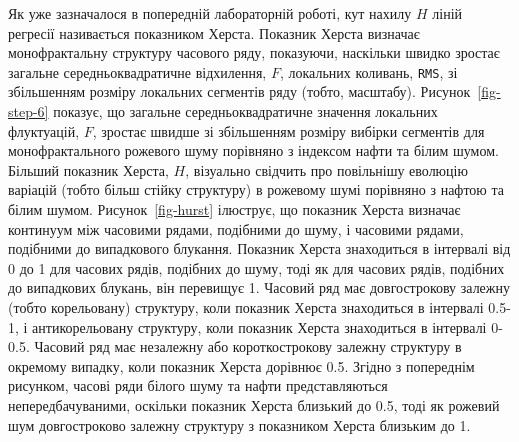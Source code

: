 \documentclass[
  letterpaper,
]{report}
\begin{document}
Як уже зазначалося в попередній лабораторній роботі, кут нахилу \(H\)
ліній регресії називається показником Херста. Показник Херста визначає
монофрактальну структуру часового ряду, показуючи, наскільки швидко
зростає загальне середньоквадратичне відхилення, \(F\), локальних
коливань, \texttt{RMS}, зі збільшенням розміру локальних сегментів ряду
(тобто, масштабу). Рисунок~\ref{fig-step-6} показує, що загальне
середньоквадратичне значення локальних флуктуацій, \(F\), зростає швидше
зі збільшенням розміру вибірки сегментів для монофрактального рожевого
шуму порівняно з індексом нафти та білим шумом. Більший показник Херста,
\(H\), візуально свідчить про повільнішу еволюцію варіацій (тобто більш
стійку структуру) в рожевому шумі порівняно з нафтою та білим шумом.
Рисунок~\ref{fig-hurst} ілюструє, що показник Херста визначає континуум
між часовими рядами, подібними до шуму, і часовими рядами, подібними до
випадкового блукання. Показник Херста знаходиться в інтервалі від 0 до 1
для часових рядів, подібних до шуму, тоді як для часових рядів, подібних
до випадкових блукань, він перевищує 1. Часовий ряд має довгострокову
залежну (тобто корельовану) структуру, коли показник Херста знаходиться
в інтервалі 0.5-1, і антикорельовану структуру, коли показник Херста
знаходиться в інтервалі 0-0.5. Часовий ряд має незалежну або
короткострокову залежну структуру в окремому випадку, коли показник
Херста дорівнює 0.5. Згідно з попереднім рисунком, часові ряди білого
шуму та нафти представляються непередбачуваними, оскільки показник
Херста близький до 0.5, тоді як рожевий шум довгостроково залежну
структуру з показником Херста близьким до 1.
\end{document}
